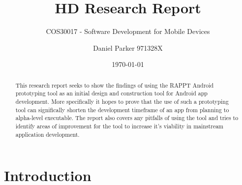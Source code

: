\documentclass[11pt,english,numbers=endperiod,parskip=half,abstract=on]{scrreprt}
\title{HD Research Report}
\subtitle{COS30017 - Software Development for Mobile Devices}
\author{Daniel Parker 971328X}
\date{\today}
\begin{document}
\maketitle
\begin{abstract}
  This research report seeks to show the findings of using the RAPPT Android
  prototyping tool as an initial design and construction tool for Android app
  development. More specifically it hopes to prove that the use of such a
  prototyping tool can significally shorten the development timeframe of an app
  from planning to alpha-level executable. The report also covers any pitfalls
  of using the tool and tries to identify areas of improvement for the tool to
  increase it's viability in mainstream application development.
\end{abstract}
\thispagestyle{empty}

\section{Introduction}
\end{document}
